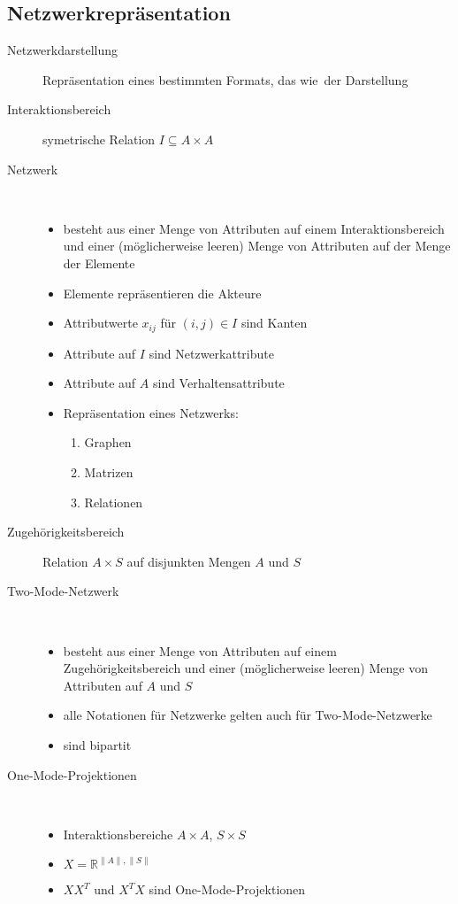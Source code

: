 \subsection{Netzwerkrepräsentation}
	\begin{description}
		\item[Netzwerkdarstellung] Repräsentation eines bestimmten Formats, das \glqq wie\grqq\ der Darstellung
		\item[Interaktionsbereich] symetrische Relation $I\subseteq A\times A$
		\item[Netzwerk] \ \\\vspace*{-\baselineskip}
			\begin{itemize}
				\item besteht aus einer Menge von Attributen auf einem Interaktionsbereich und einer (möglicherweise leeren) Menge von Attributen auf der Menge der Elemente
				\item Elemente repräsentieren die Akteure
				\item Attributwerte $x_{ij}$ für $(i,j)\in I$ sind Kanten
				\item Attribute auf $I$ sind Netzwerkattribute
				\item Attribute auf $A$ sind Verhaltensattribute
				\item Repräsentation eines Netzwerks:
					\begin{enumerate}
						\item Graphen
						\item Matrizen
						\item Relationen
					\end{enumerate}
			\end{itemize}
		\item[Zugehörigkeitsbereich] Relation $A\times S$ auf disjunkten Mengen $A$ und $S$
	\end{description}
	\topbreak
	\vspace*{-\baselineskip}
	\begin{description}
		\item[Two-Mode-Netzwerk] \ \\\vspace*{-\baselineskip}
			\begin{itemize}
				\item besteht aus einer Menge von Attributen auf einem Zugehörigkeitsbereich und einer (möglicherweise leeren) Menge von Attributen auf $A$ und $S$
				\item alle Notationen für Netzwerke gelten auch für Two-Mode-Netzwerke
				\item sind bipartit
			\end{itemize}
		\item[One-Mode-Projektionen]\ \\\vspace*{-\baselineskip}
			\begin{itemize}
				\item Interaktionsbereiche $A\times A$, $S\times S$
				\item $X=\mathbb{R}^{\|A\|,\|S\|}$
				\item $XX^T$ und $X^TX$ sind One-Mode-Projektionen
			\end{itemize}
	\end{description}

